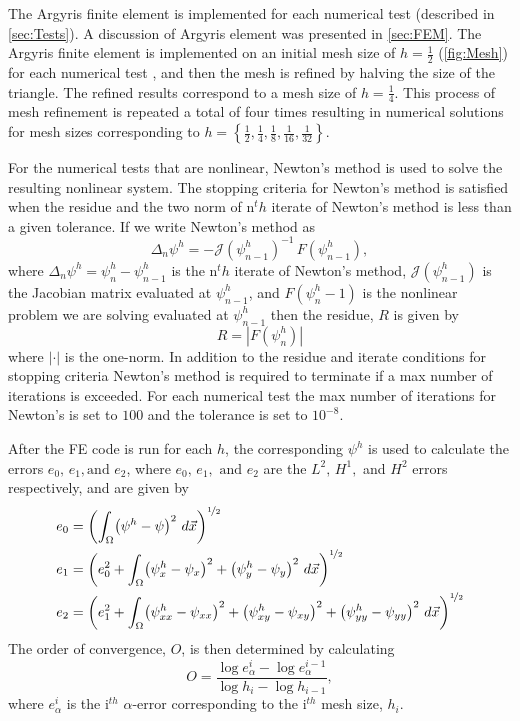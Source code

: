 The Argyris finite element is implemented for each numerical test (described in
\autoref{sec:Tests}). A discussion of Argyris element was presented in \autoref{sec:FEM}. The
Argyris finite element is implemented on an initial mesh size of $h=\frac{1}{2}$
(\autoref{fig:Mesh}) for each numerical test , and then the mesh is refined by halving the size of
the triangle. The refined results correspond to a mesh size of $h=\frac{1}{4}$.  This process of
mesh refinement is repeated a total of four times resulting in numerical solutions for mesh sizes
corresponding to $h=\left\{\frac{1}{2},\frac{1}{4},\frac{1}{8},\frac{1}{16},\frac{1}{32}\right\}$.


For the numerical tests that are nonlinear, Newton's method is used to solve the resulting
nonlinear system. The stopping criteria for Newton's method is satisfied when the residue and the
two norm of n$^th$ iterate of Newton's method is less than a given tolerance. If we write Newton's
method as 
\begin{equation*}
  \Delta_n \psi^h = -\mathcal{J}(\psi^h_{n-1})^{-1}\, F(\psi^h_{n-1}),
\end{equation*}
where $\Delta_n \psi^h = \psi^h_n - \psi^h_{n-1}$ is the n$^th$ iterate of Newton's method,
$\mathcal{J}(\psi^h_{n-1})$ is the Jacobian matrix evaluated at $\psi^h_{n-1}$, and $F(\psi^h_n-1)$
is the nonlinear problem we are solving evaluated at $\psi^h_{n-1}$ then the residue, $R$ is given by
\begin{equation*}
  R = \left|F(\psi^h_n)\right|
\end{equation*}
where $|\cdot|$ is the one-norm. In addition to the residue and iterate conditions for stopping
criteria Newton's method is required to terminate if a max number of iterations is exceeded. For
each numerical test the max number of iterations for Newton's is set to $100$ and the tolerance is
set to $10^{-8}$.

After the FE code is run for each $h$, the corresponding $\psi^h$ is used to calculate the errors $e_0,\, e_1,\text{
and } e_2$, where $e_0,\, e_1,\text{ and } e_2$ are the $L^2,\, H^1,$ and $H^2$ errors respectively, and are
given by 
\begin{align*}
  e_0 &= \left(\int_{\Omega}\!\left( \psi^h - \psi \right)^2 \,d\vec{x}\right)^{\nicefrac{1}{2}}\\
  e_1 &= \left(e_0^2 + \int_{\Omega}\!  \left( \psi^h_x - \psi_x \right)^2 + \left( \psi^h_y - \psi_y \right)^2
    \,d\vec{x}\right)^{\nicefrac{1}{2}}\\
  e_2 &= \left(e_1^2 + \int_{\Omega}\!  \left( \psi^h_{xx} - \psi_{xx} \right)^2 + \left( \psi^h_{xy} - \psi_{xy}
    \right)^2 + \left( \psi^h_{yy} - \psi_{yy} \right)^2 \,d\vec{x}\right)^{\nicefrac{1}{2}}\\
\end{align*}
The order of convergence, $O$, is then determined by calculating 
\begin{equation*}
  O = \dfrac{\log e_{\alpha}^i - \log e_{\alpha}^{i-1}}{\log h_i - \log h_{i-1}},
\end{equation*}
where $e_{\alpha}^i$ is the i$^{th}$ $\alpha$-error corresponding to the i$^{th}$ mesh size, $h_i$. 

